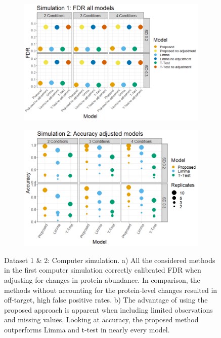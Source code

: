 \documentclass[mcp]{article}
\numberwithin{table}{section}
\begin{document}
\begin{figure}[ht]
\centering
\begin{subfigure}[c]{0.825\linewidth}
\includegraphics[width=1\textwidth]{images/sim1_FDR_all_models.png}
\caption{}
\label{fig:spikein_prop_volcano}
\end{subfigure}
\begin{subfigure}[c]{0.825\linewidth}
\includegraphics[width=1\textwidth]{images/sim3_Accuracy.png}
\caption{}
\end{subfigure}
\caption{Dataset 1 \& 2: Computer simulation. a) All the considered methods in the first computer simulation correctly calibrated FDR when adjusting for changes in protein abundance. In comparison, the methods without accounting for the protein-level changes resulted in off-target, high false positive rates. b) The advantage of using the proposed approach is apparent when including limited observations and missing values. Looking at accuracy, the proposed method outperforms Limma and t-test in nearly every model.
}
\label{fig:computer_sim}
\end{figure}
\end{document}
